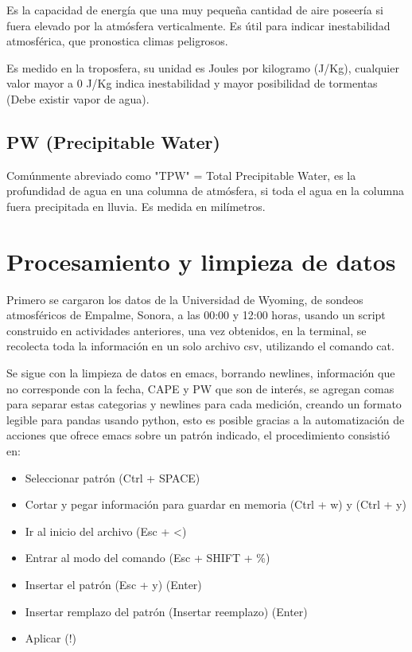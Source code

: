 \documentclass[a4paper]{article}
\begin{document}
Es la capacidad de energía que una muy pequeña cantidad de aire poseería si fuera elevado por la atmósfera verticalmente. Es útil para indicar inestabilidad atmosférica, que pronostica climas peligrosos. 

Es medido en la troposfera, su unidad es Joules por kilogramo (J/Kg), cualquier valor mayor a 0 J/Kg indica inestabilidad y mayor posibilidad de tormentas (Debe existir vapor de agua).

	\subsection{PW (Precipitable Water)}

Comúnmente abreviado como "TPW" = Total Precipitable Water,   es la profundidad de agua en una columna de atmósfera, si toda el agua en la columna fuera precipitada en lluvia. Es medida en milímetros. 


\section{Procesamiento y limpieza de datos}

Primero se cargaron los datos de la Universidad de Wyoming, de sondeos atmosféricos de Empalme, Sonora, a las 00:00 y 12:00 horas, usando un script construido en actividades anteriores, una vez obtenidos, en la terminal, se recolecta toda la información en un solo archivo csv, utilizando el comando cat.

Se sigue con la limpieza de datos en emacs, borrando newlines, información que no corresponde con la fecha, CAPE y PW que son de interés, se agregan comas para separar estas categorias y newlines para cada medición, creando un formato legible para pandas usando python, esto es posible gracias a la automatización de acciones que ofrece emacs sobre un patrón indicado, el procedimiento consistió en:

\begin{itemize}
\item Seleccionar patrón (Ctrl + SPACE)
\item Cortar y pegar información para guardar en memoria (Ctrl + w) y (Ctrl + y)
\item Ir al inicio del archivo (Esc + <)
\item Entrar al modo del comando (Esc + SHIFT + \%)
\item Insertar el patrón (Esc + y) (Enter)
\item Insertar remplazo del patrón (Insertar reemplazo) (Enter)
\item Aplicar (!)
\end{itemize}
\end{document}
